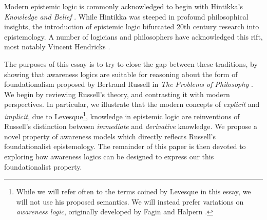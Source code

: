 Modern epistemic logic is commonly acknowledged to begin with
Hintikka's \emph{Knowledge and Belief}
\cite{hintikka_knowledge_1969}. While Hintikka was steeped in
profound philosophical insights, the introduction of epistemic logic
bifurcated 20th century research into epistemology.  A number of
logicians and philosophers have acknowledged this rift, most notably
Vincent Hendricks \cite{hendricks_wheres_2006,
  hendricks_mainstream_2006}.

The purposes of this essay is to try to close the gap between these
traditions, by showing that awareness logics are suitable for
reasoning about the form of foundationalism proposed
by Bertrand Russell in \emph{The Problems of Philosophy}
\cite{russell_problems_1936}.  We begin by reviewing Russell's
theory, and contrasting it with modern perspectives.  In particular,
we illustrate that the modern concepts of \emph{explicit} and
\emph{implicit}, due to Levesque\footnote{While we will refer often to
  the terms coined by Levesque in this essay, we will not use his
  proposed semantics.  We will instead prefer variations on
  \emph{awareness logic}, originally developed by Fagin and Halpern \cite{fagin_belief_1988}.}\cite{levesque_logic_1984}, knowledge in epistemic logic are reinventions of
Russell's distinction between \emph{immediate} and \emph{derivative}
knowledge.  We propose a novel property of awareness models which
directly reflects Russell's foundationalist epistemology.  The
remainder of this paper is then devoted to exploring how awareness
logics can be designed to express our this foundationalist property.


